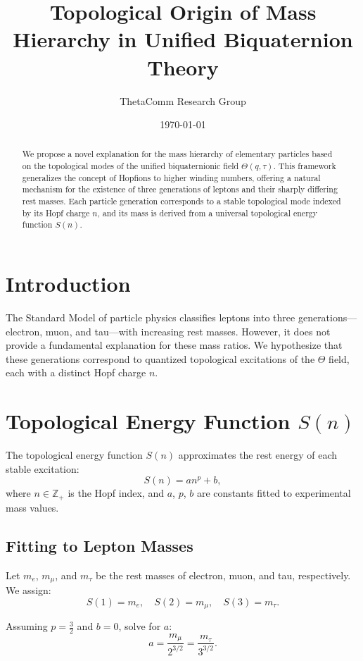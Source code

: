 \documentclass[12pt]{article}
\title{Topological Origin of Mass Hierarchy in Unified Biquaternion Theory}
\author{ThetaComm Research Group}
\date{\today}
\begin{document}
\maketitle

\begin{abstract}
We propose a novel explanation for the mass hierarchy of elementary particles based on the topological modes of the unified biquaternionic field $\Theta(q, \tau)$. This framework generalizes the concept of Hopfions to higher winding numbers, offering a natural mechanism for the existence of three generations of leptons and their sharply differing rest masses. Each particle generation corresponds to a stable topological mode indexed by its Hopf charge $n$, and its mass is derived from a universal topological energy function $S(n)$.
\end{abstract}

\section{Introduction}

The Standard Model of particle physics classifies leptons into three generations---electron, muon, and tau---with increasing rest masses. However, it does not provide a fundamental explanation for these mass ratios. We hypothesize that these generations correspond to quantized topological excitations of the $\Theta$ field, each with a distinct Hopf charge $n$.

\section{Topological Energy Function $S(n)$}

The topological energy function $S(n)$ approximates the rest energy of each stable excitation:
\[
S(n) = a n^p + b,
\]
where $n \in \mathbb{Z}_+$ is the Hopf index, and $a$, $p$, $b$ are constants fitted to experimental mass values.

\subsection{Fitting to Lepton Masses}

Let $m_e$, $m_\mu$, and $m_\tau$ be the rest masses of electron, muon, and tau, respectively. We assign:
\[
S(1) = m_e,\quad S(2) = m_\mu,\quad S(3) = m_\tau.
\]

Assuming $p = \frac{3}{2}$ and $b = 0$, solve for $a$:
\[
a = \frac{m_\mu}{2^{3/2}} = \frac{m_\tau}{3^{3/2}}.
\]
\end{document}

